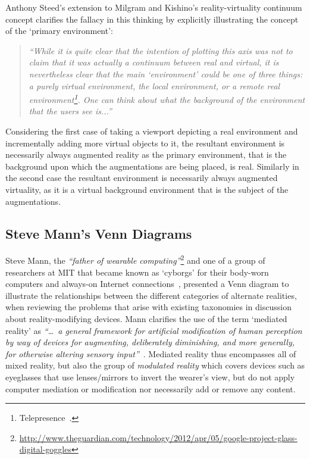 Anthony Steed's extension to Milgram and Kishino's reality-virtuality continuum concept clarifies the fallacy in this thinking by explicitly illustrating the concept of the `primary environment':

\begin{quote}
\textit{``While it is quite clear that the intention of plotting this axis was not to claim that it was actually a continuum between real and virtual, it is nevertheless clear that the main `environment' could be one of three things: a purely virtual environment, the local environment, or a remote real environment\footnote{Telepresence~\cite{Sheridan1992a}.}. One can think about what the background of the environment that the users see is...''}~\cite{Steed2014}
\end{quote}

Considering the first case of taking a viewport depicting a real environment and incrementally adding more virtual objects to it, the resultant environment is necessarily always augmented reality as the primary environment, that is the background upon which the augmentations are being placed, is real. Similarly in the second case the resultant environment is necessarily always augmented virtuality, as it is a virtual background environment that is the subject of the augmentations.


\subsection{Steve Mann's Venn Diagrams}
\label{stevemannvenn}
Steve Mann, the \textit{``father of wearable computing''}\footnote{\url{http://www.theguardian.com/technology/2012/apr/05/google-project-glass-digital-goggles}} and one of a group of researchers at MIT that became known as `cyborgs' for their body-worn computers and always-on Internet connections~\cite{Turkle2011}, presented a Venn diagram to illustrate the relationships between the different categories of alternate realities, when reviewing the problems that arise with existing taxonomies in  discussion about reality-modifying devices. Mann clarifies the use of the term `mediated reality' as \textit{``\ldots\ a general framework for artificial modification of human perception by way of devices for augmenting, deliberately diminishing, and more generally, for otherwise altering sensory input''}~\cite{Mann2002a}. Mediated reality thus encompasses all of mixed reality, but also the group of \textit{modulated reality} which covers devices such as eyeglasses that use lenses/mirrors to invert the wearer's view, but do not apply computer mediation or modification nor necessarily add or remove any content.

